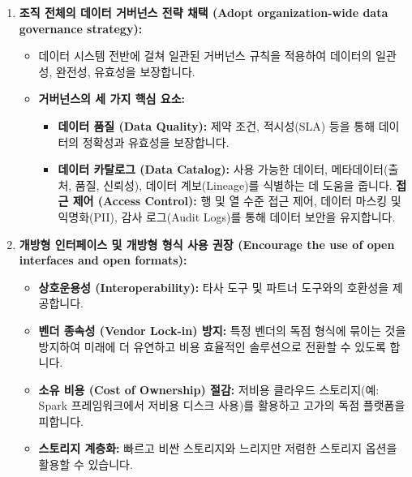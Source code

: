 \documentclass[11pt,a4paper]{article}
\theoremstyle{definition}
\begin{document}
\begin{enumerate}
    \item \textbf{조직 전체의 데이터 거버넌스 전략 채택 (Adopt organization-wide data governance strategy):}
    \begin{itemize}
        \item 데이터 시스템 전반에 걸쳐 일관된 거버넌스 규칙을 적용하여 데이터의 일관성, 완전성, 유효성을 보장합니다.
        \item \textbf{거버넌스의 세 가지 핵심 요소:}
        \begin{itemize}
            \item \textbf{데이터 품질 (Data Quality):} 제약 조건, 적시성(SLA) 등을 통해 데이터의 정확성과 유효성을 보장합니다.
            \item \textbf{데이터 카탈로그 (Data Catalog):} 사용 가능한 데이터, 메타데이터(출처, 품질, 신뢰성), 데이터 계보(Lineage)를 식별하는 데 도움을 줍니다.
            \textbf{접근 제어 (Access Control):} 행 및 열 수준 접근 제어, 데이터 마스킹 및 익명화(PII), 감사 로그(Audit Logs)를 통해 데이터 보안을 유지합니다.
        \end{itemize}
    \end{itemize}

    \item \textbf{개방형 인터페이스 및 개방형 형식 사용 권장 (Encourage the use of open interfaces and open formats):}
    \begin{itemize}
        \item \textbf{상호운용성 (Interoperability):} 타사 도구 및 파트너 도구와의 호환성을 제공합니다.
        \item \textbf{벤더 종속성 (Vendor Lock-in) 방지:} 특정 벤더의 독점 형식에 묶이는 것을 방지하여 미래에 더 유연하고 비용 효율적인 솔루션으로 전환할 수 있도록 합니다.
        \item \textbf{소유 비용 (Cost of Ownership) 절감:} 저비용 클라우드 스토리지(예: Spark 프레임워크에서 저비용 디스크 사용)를 활용하고 고가의 독점 플랫폼을 피합니다.
        \item \textbf{스토리지 계층화:} 빠르고 비싼 스토리지와 느리지만 저렴한 스토리지 옵션을 활용할 수 있습니다.
    \end{itemize}


\end{enumerate}
\end{document}
